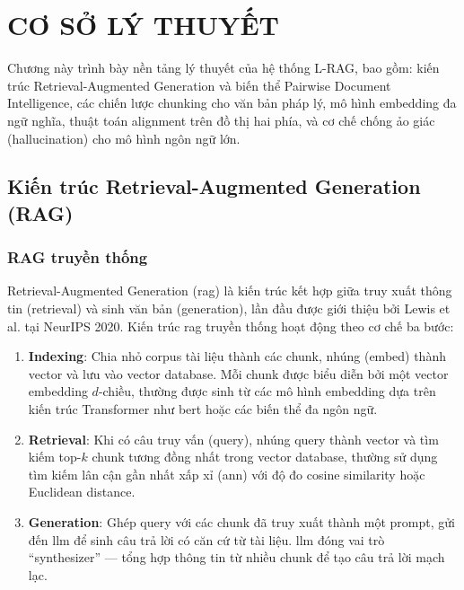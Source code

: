 \chapter{CƠ SỞ LÝ THUYẾT}

Chương này trình bày nền tảng lý thuyết của hệ thống L-RAG, bao gồm: kiến trúc Retrieval-Augmented Generation và biến thể Pairwise Document Intelligence, các chiến lược chunking cho văn bản pháp lý, mô hình embedding đa ngữ nghĩa, thuật toán alignment trên đồ thị hai phía, và cơ chế chống ảo giác (hallucination) cho mô hình ngôn ngữ lớn.

\section{Kiến trúc Retrieval-Augmented Generation (RAG)}

\subsection{RAG truyền thống}

Retrieval-Augmented Generation (\gls{rag}) là kiến trúc kết hợp giữa truy xuất thông tin (retrieval) và sinh văn bản (generation), lần đầu được giới thiệu bởi Lewis et al. \cite{lewis2020rag} tại NeurIPS 2020. Kiến trúc \gls{rag} truyền thống hoạt động theo cơ chế ba bước:

\begin{enumerate}[label=(\arabic*)]
    \item \textbf{Indexing}: Chia nhỏ corpus tài liệu thành các chunk, nhúng (embed) thành vector và lưu vào vector database. Mỗi chunk được biểu diễn bởi một vector embedding $d$-chiều, thường được sinh từ các mô hình embedding dựa trên kiến trúc Transformer \cite{vaswani2017attention} như \gls{bert} \cite{devlin2019bert} hoặc các biến thể đa ngôn ngữ.
    \item \textbf{Retrieval}: Khi có câu truy vấn (query), nhúng query thành vector và tìm kiếm top-$k$ chunk tương đồng nhất trong vector database, thường sử dụng tìm kiếm lân cận gần nhất xấp xỉ (\gls{ann}) với độ đo cosine similarity hoặc Euclidean distance.
    \item \textbf{Generation}: Ghép query với các chunk đã truy xuất thành một prompt, gửi đến \gls{llm} để sinh câu trả lời có căn cứ từ tài liệu. \gls{llm} đóng vai trò ``synthesizer'' — tổng hợp thông tin từ nhiều chunk để tạo câu trả lời mạch lạc.
\end{enumerate}

